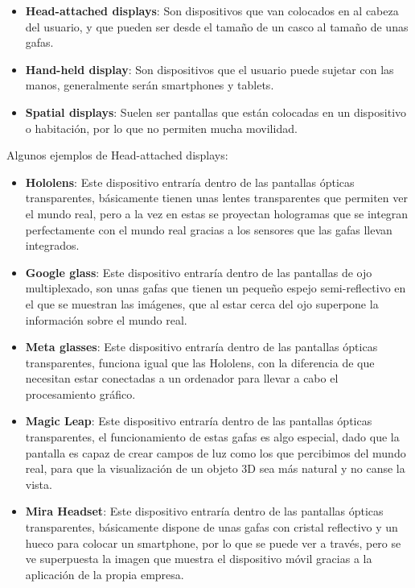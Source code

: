 \begin{itemize}
  \item \textbf{Head-attached displays}: Son dispositivos que van colocados en al cabeza del usuario, y que pueden ser desde el tamaño de un casco al tamaño de unas gafas.

  \item \textbf{Hand-held display}: Son dispositivos que el usuario puede sujetar con las manos, generalmente serán smartphones y tablets.

  \item \textbf{Spatial displays}: Suelen ser pantallas que están colocadas en un dispositivo o habitación, por lo que no permiten mucha movilidad.

\end{itemize}

\begin{flushleft}
Algunos ejemplos de Head-attached displays:
\end{flushleft}

\begin{itemize}
  \item \textbf{Hololens}: Este dispositivo entraría dentro de las pantallas ópticas transparentes, básicamente tienen unas lentes transparentes que permiten ver el mundo real, pero a la vez en estas se proyectan hologramas que se integran perfectamente con el mundo real gracias a los sensores que las gafas llevan integrados.\cite{hololens}

  \item \textbf{Google glass}: Este dispositivo entraría dentro de las pantallas de ojo multiplexado, son unas gafas que tienen un pequeño espejo semi-reflectivo en el que se muestran las imágenes, que al estar cerca del ojo superpone la información sobre el mundo real. \cite{likamwa}

  \item \textbf{Meta glasses}: Este dispositivo entraría dentro de las pantallas ópticas transparentes, funciona igual que las Hololens, con la diferencia de que necesitan estar conectadas a un ordenador para llevar a cabo el procesamiento gráfico. \cite{meta-vision}

  \item \textbf{Magic Leap}: Este dispositivo entraría dentro de las pantallas ópticas transparentes, el funcionamiento de estas gafas es algo especial, dado que la pantalla es capaz de crear campos de luz como los que percibimos del mundo real, para que la visualización de un objeto 3D sea más natural y no canse la vista. \cite{magic-leap}

  \item \textbf{Mira Headset}: Este dispositivo entraría dentro de las pantallas ópticas transparentes, básicamente dispone de unas gafas con cristal reflectivo y un hueco para colocar un smartphone, por lo que se puede ver a través, pero se ve superpuesta la imagen que muestra el dispositivo móvil gracias a la aplicación de la propia empresa. \cite{mira-ar}

\end{itemize}

